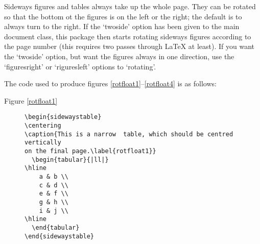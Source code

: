 \documentclass[twoside]{article}
\begin{document}
Sideways figures and tables always take up the whole page. They can be
rotated so that the bottom ot the figures is on the left or the right;
the default is to always turn to the right. If the `twoside' option
has been given to the main document class, this package then starts
rotating sideways figures according to the page number (this requires
two passes through \LaTeX{} at least). If you want the `twoside'
option, but want the figures always in one direction, use the
`figuresright' or `riguresleft' options to `rotating'.

The code used to produce figures
\ref{rotfloat1}--\ref{rotfloat4} is as follows:
\begin{description}

\item[Figure \ref{rotfloat1}]
{\small\begin{verbatim}
\begin{sidewaystable}
\centering
\caption{This is a narrow  table, which should be centred vertically
on the final page.\label{rotfloat1}}
  \begin{tabular}{|ll|}
\hline
    a & b \\
    c & d \\
    e & f \\
    g & h \\
    i & j \\
\hline
  \end{tabular}
\end{sidewaystable}
\end{verbatim}
}


\end{description}
\end{document}
